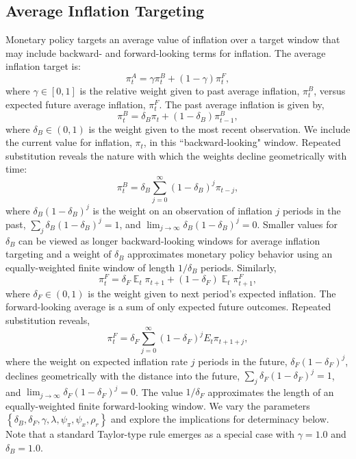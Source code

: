 \documentclass[english,authoryear,12pt]{elsarticle}
\DeclareMathOperator{\E}{\mathbb{E}}
\begin{document}
\subsection{Average Inflation Targeting}

Monetary policy targets an average value of inflation over a target window that may include backward- and forward-looking terms for inflation. The average inflation target is:
\begin{equation}
	\pi_t^A = \gamma \pi_t^B + (1-\gamma) \pi_t^F,
\end{equation}
where $\gamma \in [0,1]$ is the relative weight given to past average inflation, $\pi_t^B$, versus expected future average inflation, $\pi_t^F$. The past average inflation is given by,
\begin{equation}\label{eq:backward}
	\pi_t^B = \delta_B \pi_t + (1-\delta_B) \pi_{t-1}^B,
\end{equation}
where $\delta_B \in (0,1)$ is the weight given to the most recent observation. We include the current value for inflation, $\pi_t$, in this ``backward-looking" window.  Repeated substitution reveals the nature with which the weights decline geometrically with time:
\begin{equation}\label{eq:backward_all}
	\pi_t^B = \delta_B \sum_{j=0}^{\infty} (1-\delta_B)^j \pi_{t-j},
\end{equation}
where $\delta_B (1-\delta_B)^j$ is the weight on an observation of inflation $j$ periods in the past, $\sum_j \delta_B (1-\delta_B)^j=1$, and $\lim_{j \to \infty} \delta_B (1-\delta_B)^j=0$. Smaller values for $\delta_B$ can be viewed as longer backward-looking windows for average inflation targeting and a weight of $\delta_B$ approximates monetary policy behavior using an equally-weighted finite window of length $1 / \delta_B$ periods. Similarly,
\begin{equation}\label{eq:forward}
	\pi_t^F = \delta_F \E_t \pi_{t+1} + (1-\delta_F) \E_t \pi_{t+1}^F,
\end{equation}
where $\delta_F \in (0,1)$ is the weight given to next period's expected inflation. The forward-looking average is a sum of only expected future outcomes. Repeated substitution reveals,
\begin{equation}\label{eq:forward_all}
	\pi_t^F = \delta_F \sum_{j=0}^{\infty} (1-\delta_F)^j E_t \pi_{t+1+j},
\end{equation}
where the weight on expected inflation rate $j$ periods in the future, $\delta_F (1-\delta_F)^{j}$, declines geometrically with the distance into the future, $\sum_j \delta_F (1-\delta_F)^{j}=1$, and $\lim_{j \to \infty} \delta_F (1-\delta_F)^j=0$. The value $1/ \delta_F$ approximates the length of an equally-weighted finite forward-looking window. We vary the parameters $\left\{\delta_B, \delta_F, \gamma, \lambda, \psi_\pi, \psi_x, \rho_r \right\}$ and explore the implications for determinacy below. Note that a standard Taylor-type rule emerges as a special case with $\gamma=1.0$ and $\delta_B=1.0$.
\end{document}
